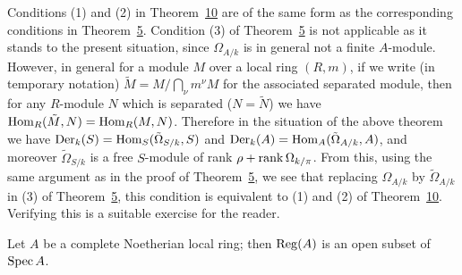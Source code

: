 \begin{remark}
Conditions (1) and (2) in Theorem~\hyperref[thm:30.10]{10} are of the same form as the
corresponding conditions in Theorem~\hyperref[thm:30.5]{5}. Condition (3) of
Theorem~\hyperref[thm:30.5]{5} is not applicable as it stands to the present situation, since
$\Omega_{A/k}$ is in general not a finite $A$-module. However, in general for a module
$M$ over a local ring $(R, m)$, if we write (in temporary notation)
$\tilde{M} = M/\bigcap_\nu m^\nu M$ for the associated separated module, then for any
$R$-module $N$ which is separated ($N = \tilde{N}$) we have
$\operatorname{Hom}_R(\tilde{M}, N) = \operatorname{Hom}_R(M, N)$. Therefore in the situation of the above theorem
we have $\operatorname{Der}_k(S) = \operatorname{Hom}_S(\tilde{\Omega}_{S/k}, S)$ and $\operatorname{Der}_k(A) = \operatorname{Hom}_A(\tilde{\Omega}_{A/k}, A)$,
and moreover $\tilde{\Omega}_{S/k}$ is a free $S$-module of rank $\rho + \operatorname{rank} \Omega_{k/\pi}$.
From this, using the same argument as in the proof of Theorem~\hyperref[thm:30.5]{5}, we see
that replacing $\Omega_{A/k}$ by $\tilde{\Omega}_{A/k}$ in (3) of Theorem~\hyperref[thm:30.5]{5}, this
condition is equivalent to (1) and (2) of Theorem~\hyperref[thm:30.10]{10}. Verifying this is a
suitable exercise for the reader.
\end{remark}

\begin{corollary*}
Let $A$ be a complete Noetherian local ring; then $\operatorname{Reg}(A)$ is an open subset of
$\operatorname{Spec} A$.
\end{corollary*}

